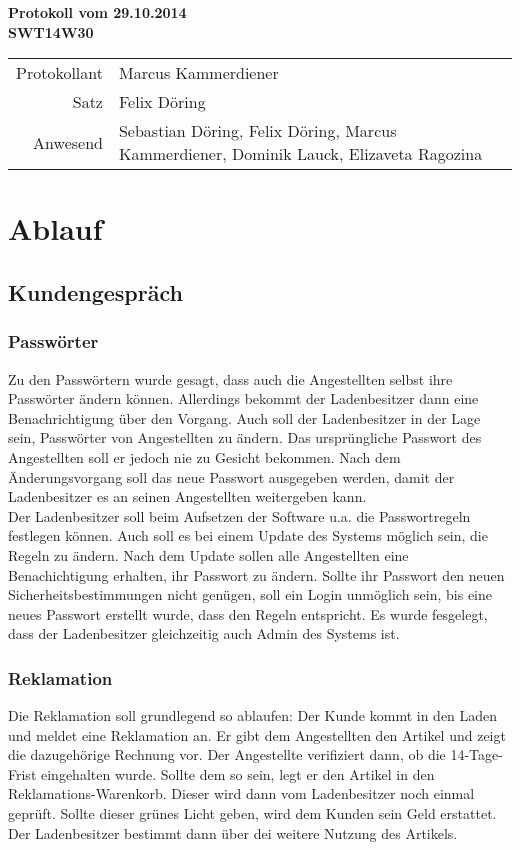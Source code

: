 \documentclass{scrartcl}
\begin{document}
\begin{center}
\LARGE \bf{Protokoll vom 29.10.2014 \\
SWT14W30}
\end{center}

\begin{tabular}{rp{10cm}}
Protokollant & Marcus Kammerdiener \\
Satz & Felix Döring \\
Anwesend & Sebastian Döring, Felix Döring, Marcus Kammerdiener, Dominik Lauck, Elizaveta Ragozina \\
\end{tabular}

\vspace*{3em}

\section{Ablauf}
\subsection{Kundengespr\"ach}
\subsubsection{Passw\"orter}
Zu den Passwörtern wurde gesagt, dass auch die Angestellten selbst ihre Passwörter ändern können. Allerdings 
bekommt der Ladenbesitzer dann eine Benachrichtigung über den Vorgang. Auch soll der Ladenbesitzer in der Lage sein, Passwörter von Angestellten zu ändern. Das ursprüngliche Passwort des Angestellten soll er jedoch nie zu Gesicht bekommen. Nach dem Änderungsvorgang soll das neue Passwort ausgegeben werden, damit der Ladenbesitzer es an seinen Angestellten weitergeben kann.\\
Der Ladenbesitzer soll beim Aufsetzen der Software u.a. die Passwortregeln festlegen können. Auch soll es bei einem
Update des Systems möglich sein, die Regeln zu ändern. Nach dem Update sollen alle Angestellten eine Benachichtigung erhalten, ihr Passwort zu ändern. Sollte ihr Passwort den neuen Sicherheitsbestimmungen nicht genügen, soll ein Login unmöglich sein, bis eine neues Passwort erstellt wurde, dass den Regeln entspricht. Es wurde fesgelegt, dass der Ladenbesitzer gleichzeitig auch Admin des Systems ist.
\subsubsection{Reklamation}
Die Reklamation soll grundlegend so ablaufen: Der Kunde kommt in den Laden und meldet eine Reklamation an. Er gibt
dem Angestellten den Artikel und zeigt die dazugehörige Rechnung vor. Der Angestellte verifiziert dann, ob die
14-Tage-Frist eingehalten wurde. Sollte dem so sein, legt er den Artikel in den Reklamations-Warenkorb. Dieser 
wird dann vom Ladenbesitzer noch einmal geprüft. Sollte dieser grünes Licht geben, wird dem Kunden sein Geld 
erstattet. Der Ladenbesitzer bestimmt dann über dei weitere Nutzung des Artikels.
\end{document}
